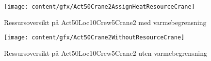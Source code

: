 \begin{figure}[h]
\centering
\texttt{[image: content/gfx/Act50Crane2AssignHeatResourceCrane]}
\caption{Ressursoversikt på Act50Loc10Crew5Crane2 med varmebegrensning}
\label{fig:RessursWithAct50Loc10Crew5Crane2}
\end{figure}
\begin{figure}[h]
\centering
\texttt{[image: content/gfx/Act50Crane2WithoutResourceCrane]}
\caption{Ressursoversikt på Act50Loc10Crew5Crane2 uten varmebegrensning}
\label{fig:RessursWithoutAct50Loc10Crew5Crane2}
\end{figure}